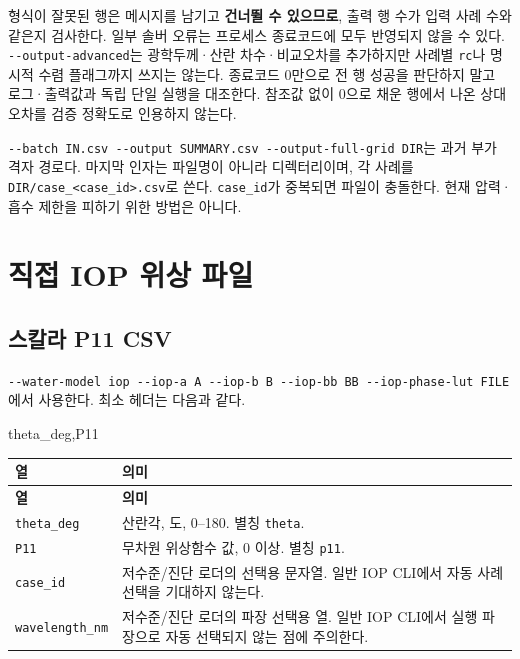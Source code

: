 형식이 잘못된 행은 메시지를 남기고 \textbf{건너뛸 수 있으므로}, 출력 행 수가 입력 사례 수와 같은지 검사한다. 일부 솔버 오류는 프로세스 종료코드에 모두 반영되지 않을 수 있다. \texttt{-\allowbreak{}-\allowbreak{}output-\allowbreak{}advanced}는 광학두께·산란 차수·비교오차를 추가하지만 사례별 \texttt{rc}나 명시적 수렴 플래그까지 쓰지는 않는다. 종료코드 0만으로 전 행 성공을 판단하지 말고 로그·출력값과 독립 단일 실행을 대조한다. 참조값 없이 0으로 채운 행에서 나온 상대오차를 검증 정확도로 인용하지 않는다.

\texttt{-\allowbreak{}-\allowbreak{}batch IN.\allowbreak{}csv -\allowbreak{}-\allowbreak{}output SUMMARY.\allowbreak{}csv -\allowbreak{}-\allowbreak{}output-\allowbreak{}full-\allowbreak{}grid DIR}는 과거 부가 격자 경로다. 마지막 인자는 파일명이 아니라 디렉터리이며, 각 사례를 \texttt{DIR/\allowbreak{}case\_\allowbreak{}<case\_\allowbreak{}id>.\allowbreak{}csv}로 쓴다. \texttt{case\_\allowbreak{}id}가 중복되면 파일이 충돌한다. 현재 압력·흡수 제한을 피하기 위한 방법은 아니다.

\section{직접 IOP 위상 파일}
\label{sec:auto:08_input_formats:4}
\subsection{스칼라 P11 CSV}
\label{sec:auto:08_input_formats:4.1}
\texttt{-\allowbreak{}-\allowbreak{}water-\allowbreak{}model iop -\allowbreak{}-\allowbreak{}iop-\allowbreak{}a A -\allowbreak{}-\allowbreak{}iop-\allowbreak{}b B -\allowbreak{}-\allowbreak{}iop-\allowbreak{}bb BB -\allowbreak{}-\allowbreak{}iop-\allowbreak{}phase-\allowbreak{}lut FILE}에서 사용한다. 최소 헤더는 다음과 같다.


\begin{ManualCode}
theta_deg,P11
\end{ManualCode}


{\TableFont
\begin{longtable}{@{}>{\raggedright\arraybackslash}p{}>{\raggedright\arraybackslash}p{}@{}}
\toprule
\textbf{열} & \textbf{의미} \\
\midrule
\endfirsthead
\toprule
\textbf{열} & \textbf{의미} \\
\midrule
\endhead
\bottomrule
\endfoot
\texttt{theta\_\allowbreak{}deg} & 산란각, 도, 0--180. 별칭 \texttt{theta}. \\
\texttt{P11} & 무차원 위상함수 값, 0 이상. 별칭 \texttt{p11}. \\
\texttt{case\_\allowbreak{}id} & 저수준/진단 로더의 선택용 문자열. 일반 IOP CLI에서 자동 사례 선택을 기대하지 않는다. \\
\texttt{wavelength\_\allowbreak{}nm} & 저수준/진단 로더의 파장 선택용 열. 일반 IOP CLI에서 실행 파장으로 자동 선택되지 않는 점에 주의한다. \\
\end{longtable}
}

